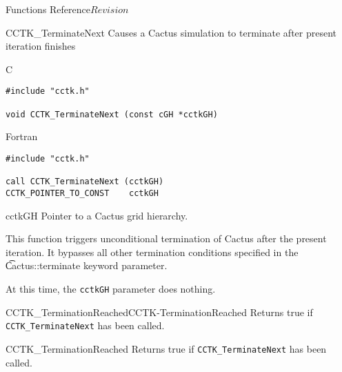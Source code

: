 \begin{cactuspart}{ Functions Reference}{}{$Revision$}
\begin{FunctionDescription}{CCTK\_TerminateNext}
\label{CCTK-TerminateNext}
Causes a Cactus simulation to terminate after present iteration finishes

\begin{SynopsisSection}
\begin{Synopsis}{C}
\begin{verbatim}
#include "cctk.h"

void CCTK_TerminateNext (const cGH *cctkGH)
\end{verbatim}
\end{Synopsis}
\begin{Synopsis}{Fortran}
\begin{verbatim}
#include "cctk.h"

call CCTK_TerminateNext (cctkGH)
CCTK_POINTER_TO_CONST    cctkGH
\end{verbatim}
\end{Synopsis}
\end{SynopsisSection}

\begin{ParameterSection}
\begin{Parameter}{cctkGH}
Pointer to a Cactus grid hierarchy.
\end{Parameter}
\end{ParameterSection}

\begin{Discussion}
This function triggers unconditional termination of Cactus after the
present iteration.
It bypasses all other termination conditions specified in the
{\t Cactus::terminate} keyword parameter.

At this time, the {\tt cctkGH} parameter does nothing.
\end{Discussion}
\begin{SeeAlsoSection}
\begin{SeeAlso2}{CCTK\_TerminationReached}{CCTK-TerminationReached}
  Returns true if {\tt CCTK\_TerminateNext} has been called.
\end{SeeAlso2}
\end{SeeAlsoSection}
\end{FunctionDescription}


\begin{FunctionDescription}{CCTK\_TerminationReached}
\label{CCTK-TerminationReached}
Returns true if {\tt CCTK\_TerminateNext} has been called.


\end{FunctionDescription}
\end{cactuspart}
